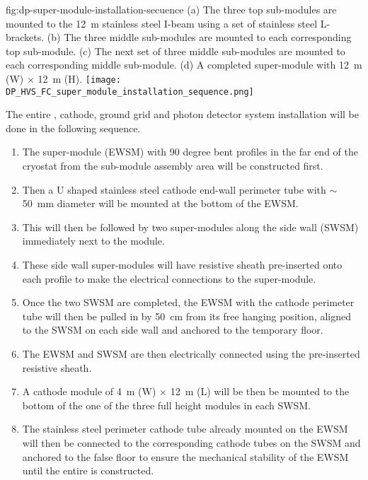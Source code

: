 \begin{dunefigure}
{fig:dp-super-module-installation-secuence}
{(a) The three top sub-modules are mounted to the \SI{12}{\m} stainless steel I-beam using a set of stainless steel L-brackets.
(b) The three middle sub-modules are mounted to each corresponding top sub-module.
(c) The next set of three middle sub-modules are mounted to each corresponding middle sub-module.
(d) A completed super-module with \SI{12}{\m} (W) $\times$ \SI{12}{\m} (H)}.
\texttt{[image: DP\_HVS\_FC\_super\_module\_installation\_sequence.png]}
\end{dunefigure}

The entire , cathode, ground grid and photon detector system installation will be done in the following sequence.
\begin{enumerate}
    \item The \endwall super-module (EWSM) with \num{90} degree bent profiles in the far end of the cryostat from the sub-module assembly area will be constructed first.
    \item Then a U shaped stainless steel cathode end-wall perimeter tube with $\sim$\SI{50}{\mm} diameter will be mounted at the bottom of the EWSM.
    \item This will then be followed by two super-modules along the side wall (SWSM) immediately next to the \endwall module.  
    \item These side wall super-modules will have resistive sheath pre-inserted onto each profile to make the electrical connections to the \endwall super-module.
    \item Once the two SWSM are completed, the EWSM with the cathode perimeter tube will then be pulled in by \SI{50}{\cm} from its free hanging position, aligned to the SWSM on each side wall and anchored to the temporary floor. 
    \item The EWSM and SWSM are then electrically connected using the pre-inserted resistive sheath.
    \item A cathode module of \SI{4}{\m} (W) $\times$ \SI{12}{\m} (L) will be then be mounted to the bottom of the one of the three full height modules in each SWSM.
    \item The stainless steel perimeter cathode tube already mounted on the EWSM will then be connected to the corresponding cathode tubes on the SWSM and anchored to the false floor to ensure the mechanical stability of the EWSM until the entire  is constructed.

\end{enumerate}
